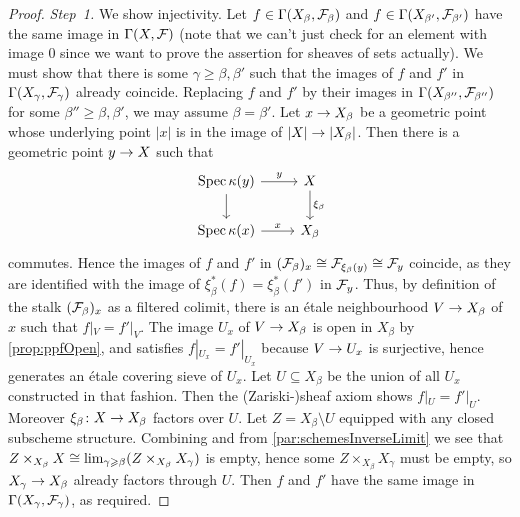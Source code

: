 \documentclass[a4paper, 10pt, oneside, DIV=9, chapterprefix=true, numbers=enddot, bibliography=totoc]{scrbook}
\begin{document}
\begin{proof}
	\emph{Step~1.} We show injectivity. Let $f\in\operatorname{\Gamma}(X_\beta,\mathcal{F}_\beta)$ and $f\in \operatorname{\Gamma}(X_{\beta'},\mathcal{F}_{\beta'})$ have the same image in $\operatorname{\Gamma}(X,\mathcal{F})$ (note that we can't just check for an element with image $0$ since we want to prove the assertion for sheaves of sets actually). We must show that there is some $\gamma\geq \beta,\beta'$ such that the images of $f$ and $f'$ in $\operatorname{\Gamma}(X_\gamma,\mathcal{F}_\gamma)$ already coincide. Replacing $f$ and $f'$ by their images in $\operatorname{\Gamma}(X_{\beta''},\mathcal{F}_{\beta''})$ for some $\beta''\geq \beta,\beta'$, we may assume $\beta=\beta'$. Let $x\morphism X_\beta$ be a geometric point whose underlying point $|x|$ is in the image of $|X|\morphism |X_\beta|$. Then there is a geometric point $y\morphism X$ such that
	\begin{equation*}
		\begin{tikzcd}
			\Spec \kappa(y)\dar\rar["y"] & X\dar["\xi_\beta"]\\
			\Spec \kappa(x) \rar["x"] & X_\beta
		\end{tikzcd} 
	\end{equation*}
	commutes. Hence the images of $f$ and $f'$ in $(\mathcal{F}_\beta)_x\cong \mathcal{F}_{\xi_\beta(y)}\cong \mathcal{F}_y$ coincide, as they are identified with the image of $\xi_\beta^*(f)=\xi_\beta^*(f')$ in $\mathcal{F}_y$. Thus, by definition of the stalk $(\mathcal{F}_\beta)_x$ as a filtered colimit, there is an étale neighbourhood $V\morphism X_\beta$ of $x$ such that $f|_V=f'|_V$. The image $U_x$ of $V\morphism X_\beta$ is open in $X_\beta$ by \cref{prop:ppfOpen}, and satisfies $f|_{U_x}=f'|_{U_x}$ because $V\morphism U_x$ is surjective, hence generates an étale covering sieve of $U_x$. Let $U\subseteq X_\beta$ be the union of all $U_x$ constructed in that fashion. Then the (Zariski-)sheaf axiom shows $f|_U=f'|_U$. Moreover $\xi_\beta\colon X\morphism X_\beta$ factors over $U$. Let $Z=X_\beta\setminus U$ equipped with any closed subscheme structure. Combining  and  from \cref{par:schemesInverseLimit} we see that $Z\times_{X_\beta}X\cong \operatorname*{lim}_{\gamma\geqslant \beta} (Z\times_{X_\beta}X_\gamma)$ is empty, hence some $Z\times_{X_\beta}X_\gamma$ must be empty, so $X_\gamma\morphism X_\beta$ already factors through $U$. Then $f$ and $f'$ have the same image in $\operatorname{\Gamma}(X_\gamma,\mathcal{F}_\gamma)$, as required.
	

\end{proof}
\end{document}
